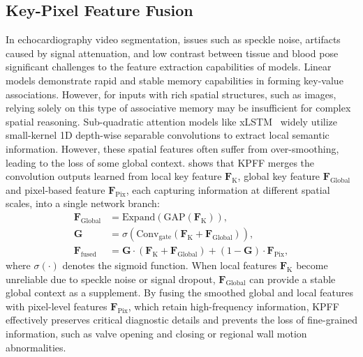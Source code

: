\subsection{Key-Pixel Feature Fusion}
    \label{subsec:kpff}
In echocardiography video segmentation, issues such as speckle noise, artifacts caused by signal attenuation, and low contrast between tissue and blood pose significant challenges to the feature extraction capabilities of models.
Linear models demonstrate rapid and stable memory capabilities in forming key-value associations. However, for inputs with rich spatial structures, such as images, relying solely on this type of associative memory may be insufficient for complex spatial reasoning. Sub-quadratic attention models like xLSTM~\cite{beck:24xlstm} widely utilize small-kernel 1D depth-wise separable convolutions to extract local semantic information. However, these spatial features often suffer from over-smoothing, leading to the loss of some global context.
 shows that KPFF merges the convolution outputs learned from local key feature $\mathbf{F}_{\mathrm{K}}$, global key feature $\mathbf{F}_{\mathrm{Global}}$ and pixel-based feature $\mathbf{F}_{\mathrm{Pix}}$, each capturing information at different spatial scales, into a single network branch:
\begin{equation}
    \begin{aligned}
        \mathbf{F}_{\mathrm{Global}}        &= \mathrm{Expand} (\mathrm{GAP} (\mathbf{F}_{\mathrm{K}})), \\
        \mathbf{G}                          &= \sigma(\mathrm{Conv}_{\mathrm{gate}}(\mathbf{F}_{\mathrm{K}} + \mathbf{F}_{\mathrm{Global}})), \\
        \mathbf{F}_{\mathrm{fused}}         &= \mathbf{G} \cdot (\mathbf{F}_{\mathrm{K}} + \mathbf{F}_{\mathrm{Global}}) + (1 - \mathbf{G}) \cdot \mathbf{F}_{\mathrm{Pix}}, 
    \end{aligned}
    \label{eq:kpff}
\end{equation}
where $\sigma(\cdot)$ denotes the sigmoid function. 
When local features $\mathbf{F}_{\mathrm{K}}$ become unreliable due to speckle noise or signal dropout, $\mathbf{F}_{\mathrm{Global}}$ can provide a stable global context as a supplement. By fusing the smoothed global and local features with pixel-level features $\mathbf{F}_{\mathrm{Pix}}$, which retain high-frequency information, KPFF effectively preserves critical diagnostic details and prevents the loss of fine-grained information, such as valve opening and closing or regional wall motion abnormalities. 